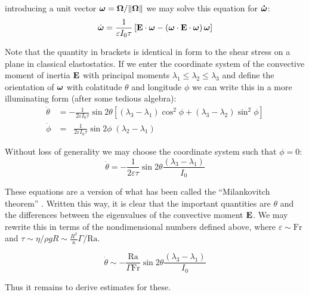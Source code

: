 \documentclass[extra]{gji}
\begin{document}
introducing a unit vector $\mitbf{\omega} = {\bf \Omega}/\|{\bf \Omega} \|$ we may solve this equation for ${\bf \dot{\mitbf{\omega}} }$:
\begin{equation}
 \dot{\mitbf{\omega}}  = \frac{1}{\varepsilon I_0 \tau} \left[ {\bf E \cdot \mitbf{\omega}} - \left( {\bf \mitbf{\omega} \cdot E \cdot \mitbf{\omega} } \right) \mitbf{\omega} \right]
\end{equation}

Note that the quantity in brackets is identical in form to the shear stress on a plane in classical elastostatics.
If we enter the coordinate system of the convective moment of inertia $\bf E$ with principal moments $\lambda_1 \le \lambda_2 \le \lambda_3$ and define the orientation of $\mitbf{\omega}$ with colatitude $\theta$ and longitude $\phi$ we can write this in a more illuminating form (after some tedious algebra):
\begin{equation}
\begin{aligned}
\dot{\theta} &= - \frac{1}{2 \varepsilon I_0 \tau} \sin{2 \theta} \left[ (\lambda_3-\lambda_1) \cos^2{\phi} + (\lambda_3-\lambda_2) \sin^2{\phi} \right] \\
\dot{\phi} &= \;\; \frac{1}{2 \varepsilon I_0 \tau} \sin{2 \phi} \; (\lambda_2 - \lambda_1)
\end{aligned}
\label{milankovitch}
\end{equation}

Without loss of generality we may choose the coordinate system such that $\phi=0$:
\begin{equation}
\dot{\theta} = - \frac{1}{2 \varepsilon \tau}\sin{2 \theta} \frac{(\lambda_3-\lambda_1)}{I_0}
\end{equation}

These equations are a version of what has been called the ``Milankovitch theorem'' \citep{munk1960rotation}.  
Written this way, it is clear that the important quantities are $\theta$ and the differences between the eigenvalues of the convective moment $\bf E$.
We may rewrite this in terms of the nondimensional numbers defined above, where $\varepsilon \sim \mathrm{Fr}$ and $\tau \sim \eta / \rho g R \sim \frac{R^2}{\kappa} \Gamma/\mathrm{Ra}$. 

\begin{equation}
\dot{\theta} \sim - \frac{\mathrm{Ra}}{\Gamma \mathrm{Fr}} \sin{2 \theta} \frac{(\lambda_3-\lambda_1)}{I_0}
\end{equation}

Thus it remains to derive estimates for these.
\end{document}
